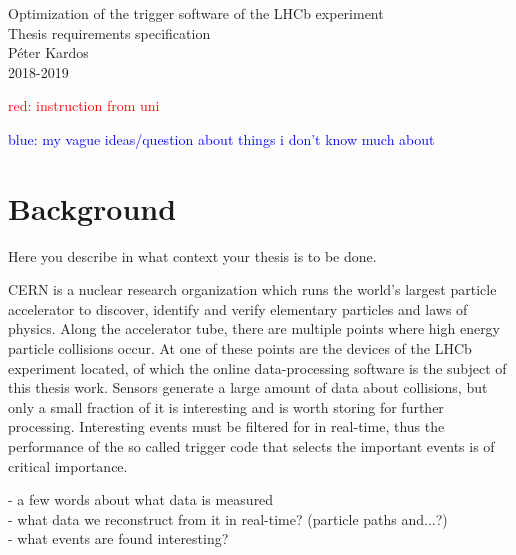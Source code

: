 \documentclass[12pt]{article}
\begin{document}
	
	
	\begin{center}
		\Huge Optimization of the trigger software of the LHCb experiment\\		
		\Large Thesis requirements specification\\
		\vspace{1pc}
		\huge Péter Kardos \\
		\large 2018-2019
	\end{center}
	\vspace{.5pc}
	
	
	\textcolor{red}{red: instruction from uni}
	
	\textcolor{blue}{blue: my vague ideas/question about things i don't know much about}
	
	
	\section{Background}
	
	\color{red}
	Here you describe in what context your thesis is to be done.
	\color{black}
	
	CERN is a nuclear research organization which runs the world's largest particle accelerator to discover, identify and verify elementary particles and laws of physics. Along the accelerator tube, there are multiple points where high energy particle collisions occur. At one of these points are the devices of the LHCb experiment located, of which the online data-processing software is the subject of this thesis work. Sensors generate a large amount of data about collisions, but only a small fraction of it is interesting and is worth storing for further processing. Interesting events must be filtered for in real-time, thus the performance of the so called trigger code that selects the important events is of critical importance.
	
	\vspace{1pc}
	\color{blue}
	- a few words about what data is measured \\
	- what data we reconstruct from it in real-time? (particle paths and...?)\\
	- what events are found interesting?
	\color{black}
	
\end{document}
